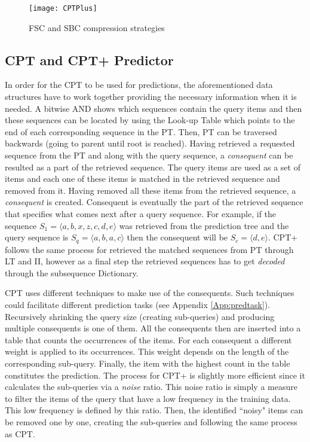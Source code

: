 \begin{figure}[h]
    \centering
    \texttt{[image: CPTPlus]}
    \caption{FSC and SBC compression strategies}
    \label{fig:CPTPlus}
\end{figure}

\subsection{CPT and CPT+ Predictor}\label{predictors}
In order for the CPT to be used for predictions, the aforementioned data structures have to work together providing the necessary information when it is needed. A bitwise AND shows which sequences contain the query items and then these sequences can be located by using the Look-up Table which points to the end of each corresponding sequence in the PT. Then, PT can be traversed backwards (going to parent until root is reached). Having retrieved a requested sequence from the PT and along with the query sequence, a \emph{consequent} can be resulted as a part of the retrieved sequence. The query items are used as a set of items and each one of these items is matched in the retrieved sequence and removed from it. Having removed all these items from the retrieved sequence, a \emph{consequent} is created. Consequent is eventually the part of the retrieved sequence that specifies what comes next after a query sequence. For example, if the sequence \(S_1=\langle a, b, x, z, c, d, e\rangle\) was retrieved from the prediction tree and the query sequence is \(S_q=\langle a, b, a, c\rangle\) then the consequent will be \(S_c=\langle d, e\rangle\). CPT+ follows the same process for retrieved the matched sequences from PT through LT and II, however as a final step the retrieved sequences has to get \emph{decoded} through the subsequence Dictionary.
\par CPT uses different techniques \cite{gueniche_fournier-viger_tseng_2013} to make use of the consequents. Such techniques could facilitate different prediction tasks (see Appendix \ref{App:predtask}). Recursively shrinking the query size (creating sub-queries) and producing multiple consequents is one of them. All the consequents then are inserted into a table that counts the occurrences of the items. For each consequent a different weight is applied to its occurrences. This weight depends on the length of the corresponding sub-query. Finally, the item with the highest count in the table constitutes the prediction. The process for CPT+ is slightly more efficient since it calculates the sub-queries via a \emph{noise} ratio. This noise ratio is simply a measure to filter the items of the query that have a low frequency in the training data. This low frequency is defined by this ratio. Then, the identified ``noisy" items can be removed one by one, creating the sub-queries and following the same process as CPT.

